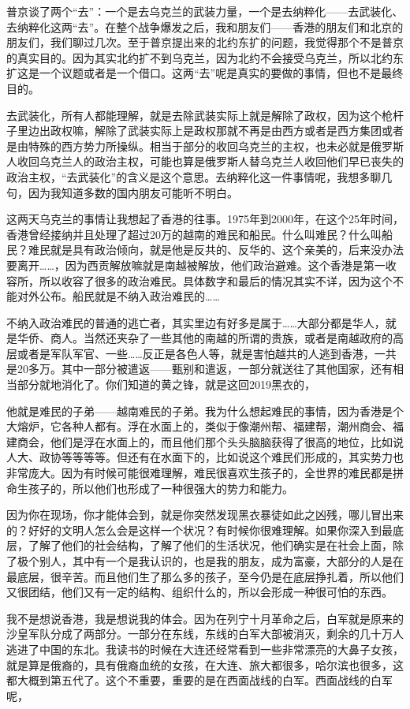 \documentclass[UTF8, 12pt, a4paper]{ctexrep}
\begin{document}
普京谈了两个“去”：一个是去乌克兰的武装力量，一个是去纳粹化——去武装化、去纳粹化这两“去”。在整个战争爆发之后，我和朋友们——香港的朋友们和北京的朋友们，我们聊过几次。至于普京提出来的北约东扩的问题，我觉得那个不是普京的真实目的。因为其实北约扩不到乌克兰，因为北约不会接受乌克兰，所以北约东扩这是一个议题或者是一个借口。这两“去”呢是真实的要做的事情，但也不是最终目的。

去武装化，所有人都能理解，就是去除武装实际上就是解除了政权，因为这个枪杆子里边出政权嘛，解除了武装实际上是政权那就不再是由西方或者是西方集团或者是由特殊的西方势力所操纵。相当于部分的收回乌克兰的主权，也未必就是俄罗斯人收回乌克兰人的政治主权，可能也算是俄罗斯人替乌克兰人收回他们早已丧失的政治主权，“去武装化”的含义是这个意思。去纳粹化这一件事情呢，我想多聊几句，因为我知道多数的国内朋友可能听不明白。

这两天乌克兰的事情让我想起了香港的往事。1975年到2000年，在这个25年时间，香港曾经接纳并且处理了超过20万的越南的难民和船民。什么叫难民？什么叫船民？难民就是具有政治倾向，就是他是反共的、反华的、这个亲美的，后来没办法要离开……，因为西贡解放嘛就是南越被解放，他们政治避难。这个香港是第一收容所，所以收容了很多的政治难民。具体数字和最后的情况其实不详，因为这个不能对外公布。船民就是不纳入政治难民的……

不纳入政治难民的普通的逃亡者，其实里边有好多是属于……大部分都是华人，就是华侨、商人。当然还夹杂了一些其他的南越的所谓的贵族，或者是南越政府的高层或者是军队军官、一些……反正是各色人等，就是害怕越共的人逃到香港，一共是20多万。其中一部分被遣返——甄别和遣返，一部分就送往了其他国家，还有相当部分就地消化了。你们知道的黄之锋，就是这回2019黑衣的，

他就是难民的子弟——越南难民的子弟。我为什么想起难民的事情，因为香港是个大熔炉，它各种人都有。浮在水面上的，类似于像潮州帮、福建帮，潮州商会、福建商会，他们是浮在水面上的，而且他们那个头头脑脑获得了很高的地位，比如说人大、政协等等等等。但还有在水面下的，比如说这个难民们形成的，其实势力也非常庞大。因为有时候可能很难理解，难民很喜欢生孩子的，全世界的难民都是拼命生孩子的，所以他们也形成了一种很强大的势力和能力。

因为你在现场，你才能体会到，就是你突然发现黑衣暴徒如此之凶残，哪儿冒出来的？好好的文明人怎么会是这样一个状况？有时候你很难理解。如果你深入到最底层，了解了他们的社会结构，了解了他们的生活状况，他们确实是在社会上面，除了极个别人，其中有一个是我认识的，也是我的朋友，成为富豪，大部分的人是在最底层，很辛苦。而且他们生了那么多的孩子，至今仍是在底层挣扎着，所以他们又很团结，他们又有一定的结构、组织什么的，所以会形成一种很可怕的东西。

我不是想说香港，我是想说我的体会。因为在列宁十月革命之后，白军就是原来的沙皇军队分成了两部分。一部分在东线，东线的白军大部被消灭，剩余的几十万人逃进了中国的东北。我读书的时候在大连还经常看到一些非常漂亮的大鼻子女孩，就是算是俄裔的，具有俄裔血统的女孩，在大连、旅大都很多，哈尔滨也很多，这都大概到第五代了。这个不重要，重要的是在西面战线的白军。西面战线的白军呢，
\end{document}
